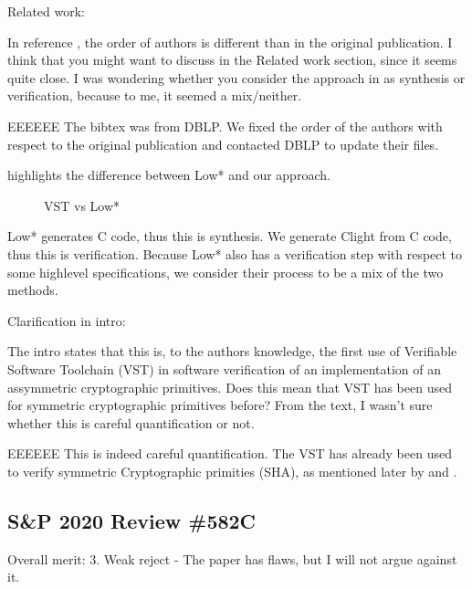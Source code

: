 Related work:

\newcommand{\rbar}{\cite{DBLP:journals/corr/BhargavanDFHPRR17}}

In reference \rbar, the order of authors is different than
in the original publication. I think that you might want to
discuss \rbar in the Related work section, since it seems quite
close. I was wondering whether you consider the approach
in \rbar as synthesis or verification, because to me, it seemed
a mix/neither.

\begin{answer}{EEEEEE}
The bibtex was from DBLP. We fixed the order of the
authors with respect to the original publication and contacted
DBLP to update their files.

 highlights the difference between Low*
and our approach.

\begin{figure}[H]
\centering

\caption{VST vs Low*}
\label{tikz:LowVST}
\end{figure}

Low* generates C code, thus this is synthesis. We generate
Clight from C code, thus this is verification. Because Low*
also has a verification step with respect to some highlevel
specifications, we consider their process to be a mix of the
two methods.
\end{answer}

Clarification in intro:

The intro states that this is, to the authors knowledge, the first use of
Verifiable Software Toolchain (VST) in software verification of an implementation
of an assymmetric cryptographic primitives. Does this mean that VST has been
used for symmetric cryptographic primitives before? From the text, I wasn't sure
whether this is careful quantification or not.

\begin{answer}{EEEEEE}
This is indeed careful quantification. The VST has already
been used to verify symmetric Cryptographic primities
(\eg SHA), as mentioned later by \cite{Beringer2015VerifiedCA} and \cite{2015-Appel}.
\end{answer}


\subsection{S\&P 2020 Review \#582C}

Overall merit: 3. Weak reject - The paper has flaws, but I will not argue against it.


